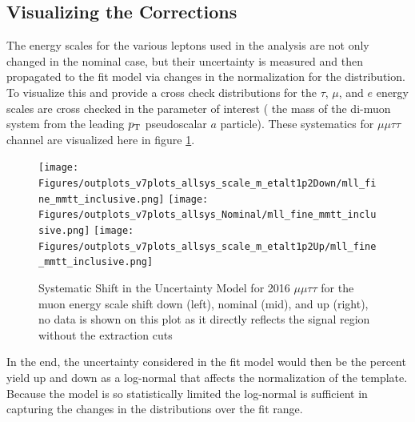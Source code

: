 \subsection{Visualizing the Corrections}
The energy scales for the various leptons used in the analysis are not only changed in the nominal case, but their uncertainty is measured and then propagated to the fit model via changes in the normalization for the distribution. To visualize this and provide a cross check distributions for the $\tau$, $\mu$, and $e$ energy scales are cross checked in the parameter of interest ( the mass of the di-muon system from the leading $p_{\mathrm{T}}$ pseudoscalar $a$ particle). 
These systematics for $\mu\mu\tau\tau$ channel are visualized here in figure \ref{fig:sys_shift_mmtt2016}.
\begin{figure}[ht!b]
  \centering
\texttt{[image: Figures/outplots\_v7plots\_allsys\_scale\_m\_etalt1p2Down/mll\_fine\_mmtt\_inclusive.png]} 
\texttt{[image: Figures/outplots\_v7plots\_allsys\_Nominal/mll\_fine\_mmtt\_inclusive.png]}
\texttt{[image: Figures/outplots\_v7plots\_allsys\_scale\_m\_etalt1p2Up/mll\_fine\_mmtt\_inclusive.png]} \\

    \caption{\label{fig:sys_shift_mmtt2016} Systematic Shift in the Uncertainty Model for 2016 $\mu\mu\tau\tau$ for the muon energy scale shift down (left), nominal (mid), and up (right), no data is shown on this plot as it directly reflects the signal region without the extraction cuts }
\end{figure}

In the end, the uncertainty considered in the fit model would then be the percent yield up and down as a log-normal that affects the normalization of the template. Because the model is so statistically limited the log-normal is sufficient in capturing the changes in the distributions over the fit range.  
